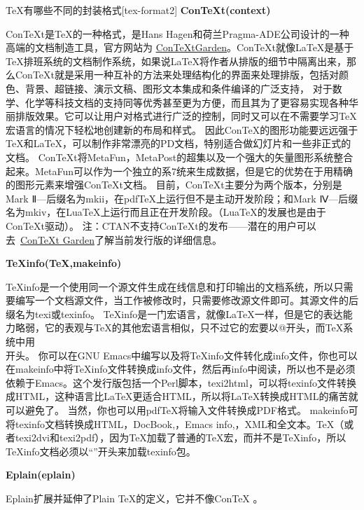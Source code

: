 \begin{faq}{\TeX{}有哪些不同的封装格式}[tex-format2]
  \textbf{ConTeXt(context)}
  
  ConTeXt是TeX的一种格式，是Hans Hagen和荷兰Pragma-ADE公司设计的一种高端的文档制造工具，官方网站为 \href{http://wiki.contextgarden.net/Main_Page}{ConTeXtGarden}。ConTeXt就像LaTeX是基于TeX排班系统的文档制作系统，如果说LaTeX将作者从排版的细节中隔离出来，那么ConTeXt就是采用一种互补的方法来处理结构化的界面来处理排版，包括对颜色、背景、超链接、演示文稿、图形文本集成和条件编译的广泛支持， 对于数学、化学等科技文档的支持同等优秀甚至更为方便，而且其为了更容易实现各种华丽排版效果。它可以让用户对格式进行广泛的控制，同时又可以在不需要学习TeX宏语言的情况下轻松地创建新的布局和样式。 因此ConTeX的图形功能要远远强于TeX和LaTeX，可以制作非常漂亮的PD文档，特别适合做幻灯片和一些非正式的文档。
  ConTeXt将MetaFun，MetaPost的超集以及一个强大的矢量图形系统整合起来。MetaFun可以作为一个独立的系7统来生成数据，但是它的优势在于用精确的图形元素来增强ConTeXt文档。
  目前，ConTeXt主要分为两个版本，分别是Mark Ⅱ—后缀名为mkii，在pdfTeX上运行但不是主动开发阶段；和Mark Ⅳ—后缀名为mkiv，在LuaTeX上运行而且正在开发阶段。（LuaTeX的发展也是由于ConTeXt驱动）。
  注：CTAN不支持ConTeXt的发布——潜在的用户可以去 \href{http://wiki.contextgarden.net/Main_Page}{ConTeXt Garden}了解当前发行版的详细信息。
  
  \textbf{TeXinfo(\TeX{},makeinfo)}
  
  TeXinfo是一个使用同一个源文件生成在线信息和打印输出的文档系统，所以只需要编写一个文档源文件，当工作被修改时，只需要修改源文件即可。其源文件的后缀名为texi或texinfo。
  TeXinfo是一门宏语言，就像LaTeX一样，但是它的表达能力略弱，它的表观与TeX的其他宏语言相似，只不过它的宏要以@开头，而TeX系统中用\\开头。
  你可以在GNU Emacs中编写以及将TeXinfo文件转化成info文件，你也可以在makeinfo中将TeXinfo文件转换成info文件，然后再info中阅读，所以也不是必须依赖于Emacs。这个发行版包括一个Perl脚本，texi2html，可以将texinfo文件转换成HTML，这种语言比LaTeX更适合HTML，所以将LaTeX转换成HTML的痛苦就可以避免了。
  当然，你也可以用pdfTeX将输入文件转换成PDF格式。
  makeinfo可将texinfo文档转换成HTML，DocBook,，Emacs info,，XML和全文本。TeX（或者texi2dvi和texi2pdf），因为TeX加载了普通的TeX宏，而并不是TeXinfo，所以TeXinfo文档必须以“\texttt{}”开头来加载texinfo包。
  
  \textbf{Eplain(eplain)}
  
  Eplain扩展并延伸了Plain TeX的定义，它并不像ConTeX 。

\end{faq}


